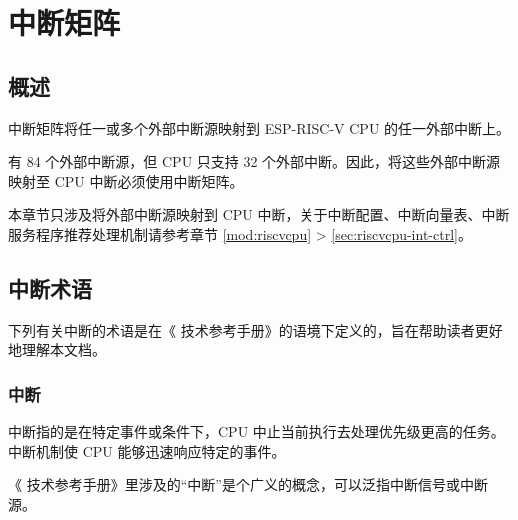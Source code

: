 \documentclass[main\_\_CN.tex]{subfiles}
\begin{document}

\ifglobal
\else
    \listoftodos
    {\let\clearpage\relax \listofdonetodos}
    \tableofcontents
\fi



\hypertarget{intmtrx}{}
\chapter{中断矩阵}
\label{mod:intmtrx}
\section{概述}

\chipname{} 中断矩阵将任一或多个外部中断源映射到 ESP-RISC-V CPU 的任一外部中断上。

\chipname{} 有 84 个外部中断源，但 CPU 只支持 32 个外部中断。因此，将这些外部中断源映射至 CPU 中断必须使用中断矩阵。

\begin{tiplisting}
本章节只涉及将外部中断源映射到 CPU 中断，关于中断配置、中断向量表、中断服务程序推荐处理机制请参考章节 \ref{mod:riscvcpu} \textit{} >  \ref{sec:riscvcpu-int-ctrl}\textit{}。
\end{tiplisting}
\vspace{-1em}

\section{中断术语}\label{sec:intmtx-int-terminology}

下列有关中断的术语是在《\chipname{} 技术参考手册》的语境下定义的，旨在帮助读者更好地理解本文档。

\subsection{中断}

中断指的是在特定事件或条件下，CPU 中止当前执行去处理优先级更高的任务。中断机制使 CPU 能够迅速响应特定的事件。

《\chipname{} 技术参考手册》里涉及的“中断”是个广义的概念，可以泛指中断信号或中断源。
\end{document}
